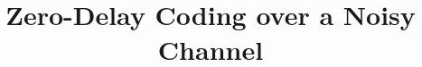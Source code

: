 \documentclass[conference]{IEEEtran}
\begin{document}
\title{Zero-Delay Coding over a Noisy Channel
}


\maketitle

\end{document}
